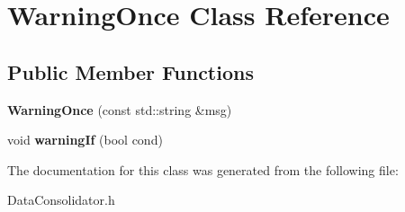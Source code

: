 \hypertarget{classWarningOnce}{\section{Warning\-Once Class Reference}
\label{classWarningOnce}
}
\subsection*{Public Member Functions}
\begin{DoxyCompactItemize}
\item 
\hypertarget{classWarningOnce_a78ee7f515a6beb2be60c6507cebda978}{{\bfseries Warning\-Once} (const std\-::string \&msg)}\label{classWarningOnce_a78ee7f515a6beb2be60c6507cebda978}

\item 
\hypertarget{classWarningOnce_a1c38737eb932bc9f1dff13dc404a4352}{void {\bfseries warning\-If} (bool cond)}\label{classWarningOnce_a1c38737eb932bc9f1dff13dc404a4352}

\end{DoxyCompactItemize}


The documentation for this class was generated from the following file\-:\begin{DoxyCompactItemize}
\item 
Data\-Consolidator.\-h\end{DoxyCompactItemize}
